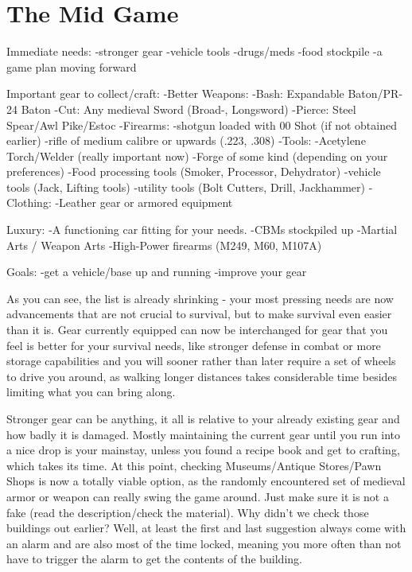 \section{The Mid Game}

Immediate needs:
-stronger gear
-vehicle tools
-drugs/meds
-food stockpile
-a game plan moving forward

Important gear to collect/craft:
-Better Weapons:
	-Bash: Expandable Baton/PR-24 Baton
	-Cut: Any medieval Sword (Broad-, Longsword)
	-Pierce: Steel Spear/Awl Pike/Estoc
-Firearms:
	-shotgun loaded with 00 Shot (if not obtained earlier)
	-rifle of medium calibre or upwards (.223, .308)
-Tools:
	-Acetylene Torch/Welder (really important now)
	-Forge of some kind (depending on your preferences)
	-Food processing tools (Smoker, Processor, Dehydrator)
	-vehicle tools (Jack, Lifting tools)
	-utility tools (Bolt Cutters, Drill, Jackhammer)
-Clothing:
	-Leather gear or armored equipment

Luxury:
-A functioning car fitting for your needs.
-CBMs stockpiled up
-Martial Arts / Weapon Arts
-High-Power firearms (M249, M60, M107A)

Goals:
-get a vehicle/base up and running
-improve your gear

As you can see, the list is already shrinking - your most pressing needs are now advancements that are not crucial to survival, but to make survival even easier than it is. Gear currently equipped can now be interchanged for gear that you feel is better for your survival needs, like stronger defense in combat or more storage capabilities and you will sooner rather than later require a set of wheels to drive you around, as walking longer distances takes considerable time besides limiting what you can bring along.

Stronger gear can be anything, it all is relative to your already existing gear and how badly it is damaged. Mostly maintaining the current gear until you run into a nice drop is your mainstay, unless you found a recipe book and get to crafting, which takes its time. At this point, checking Museums/Antique Stores/Pawn Shops is now a totally viable option, as the randomly encountered set of medieval armor or weapon can really swing the game around. Just make sure it is not a fake (read the description/check the material). Why didn't we check those buildings out earlier? Well, at least the first and last suggestion always come with an alarm and are also most of the time locked, meaning you more often than not have to trigger the alarm to get the contents of the building.

